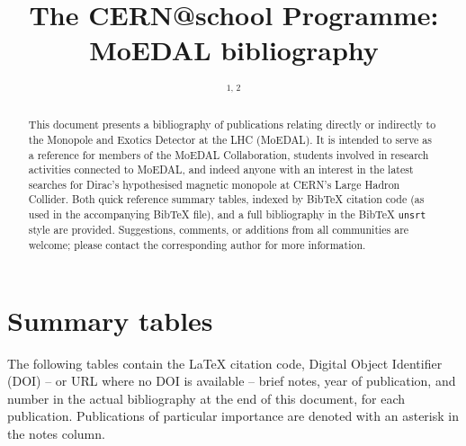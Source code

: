 \documentclass[12pt,a4paper]{iopart}
\begin{document}
%
%


\title{%
  The CERN@school Programme: \\
  MoEDAL bibliography
}
% 
\author{\theauthorinit$^{1, \, 2}$}
%
\address{$^1$\theauthoraddressA}
\address{$^2$\theauthoraddressB}
\ead{\mailto{\theauthoremail}}

\begin{abstract}
This document presents a bibliography of publications relating
directly or indirectly to the
Monopole and Exotics Detector at the LHC (MoEDAL).
%
It is intended to serve as a reference for members of the 
MoEDAL Collaboration,
students involved in research activities connected to MoEDAL,
and indeed anyone with an interest in the latest
searches for Dirac's hypothesised magnetic monopole at
CERN's Large Hadron Collider.
%
Both quick reference summary tables,
indexed by BibTeX citation code (as used in the
accompanying BibTeX file),
and a full bibliography in the BibTeX \texttt{unsrt} style
are provided.
%
Suggestions, comments, or additions from all
communities are welcome;
please contact the corresponding author
for more information.

\end{abstract}
%

\setcounter{tocdepth}{2}
\tableofcontents



\newpage

%
%


\newpage

%
%
\section{Summary tables}
\label{sec:summaries}
The following tables contain the LaTeX citation code,
Digital Object Identifier (DOI) -- or URL where no DOI is available --
brief notes, year of publication,
and
number in the actual bibliography at the end of this document,
for each publication.
%
Publications of particular importance are denoted with an
asterisk in the notes column.
%
\end{document}
